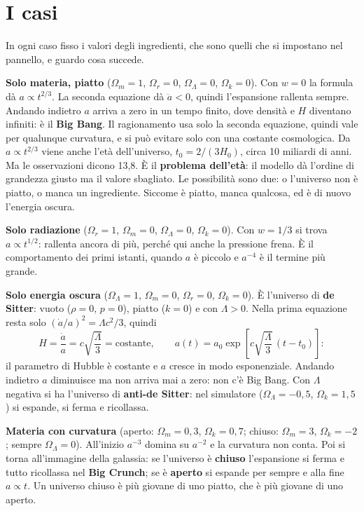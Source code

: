 \documentclass[12pt,a4paper]{article}
\begin{document}
\section{I casi}
In ogni caso fisso i valori degli ingredienti, che sono quelli che si impostano nel pannello, e guardo cosa succede.

\textbf{Solo materia, piatto} ($\Omega_m = 1$, $\Omega_r = 0$, $\Omega_\Lambda = 0$, $\Omega_k = 0$). Con $w = 0$ la formula dà $a \propto t^{2/3}$. La seconda equazione dà $\ddot a < 0$, quindi l'espansione rallenta sempre. Andando indietro $a$ arriva a zero in un tempo finito, dove densità e $H$ diventano infiniti: è il \textbf{Big Bang}. Il ragionamento usa solo la seconda equazione, quindi vale per qualunque curvatura, e si può evitare solo con una costante cosmologica. Da $a \propto t^{2/3}$ viene anche l'età dell'universo, $t_0 = 2/(3H_0)$, circa 10 miliardi di anni. Ma le osservazioni dicono 13,8. È il \textbf{problema dell'età}: il modello dà l'ordine di grandezza giusto ma il valore sbagliato. Le possibilità sono due: o l'universo non è piatto, o manca un ingrediente. Siccome è piatto, manca qualcosa, ed è di nuovo l'energia oscura.

\textbf{Solo radiazione} ($\Omega_r = 1$, $\Omega_m = 0$, $\Omega_\Lambda = 0$, $\Omega_k = 0$). Con $w = 1/3$ si trova $a \propto t^{1/2}$: rallenta ancora di più, perché qui anche la pressione frena. È il comportamento dei primi istanti, quando $a$ è piccolo e $a^{-4}$ è il termine più grande.

\textbf{Solo energia oscura} ($\Omega_\Lambda = 1$, $\Omega_m = 0$, $\Omega_r = 0$, $\Omega_k = 0$). È l'universo di \textbf{de Sitter}: vuoto ($\rho = 0$, $p = 0$), piatto ($k = 0$) e con $\Lambda > 0$. Nella prima equazione resta solo $(\dot a/a)^2 = \Lambda c^2/3$, quindi
\[ H = \frac{\dot a}{a} = c\sqrt{\frac{\Lambda}{3}} = \text{costante}, \qquad a(t) = a_0 \exp\!\left[c\sqrt{\frac{\Lambda}{3}}\,(t - t_0)\right] : \]
il parametro di Hubble è costante e $a$ cresce in modo esponenziale. Andando indietro $a$ diminuisce ma non arriva mai a zero: non c'è Big Bang. Con $\Lambda$ negativa si ha l'universo di \textbf{anti-de Sitter}: nel simulatore ($\Omega_\Lambda = -0{,}5$, $\Omega_k = 1{,}5$) si espande, si ferma e ricollassa.

\textbf{Materia con curvatura} (aperto: $\Omega_m = 0{,}3$, $\Omega_k = 0{,}7$; chiuso: $\Omega_m = 3$, $\Omega_k = -2$; sempre $\Omega_\Lambda = 0$). All'inizio $a^{-3}$ domina su $a^{-2}$ e la curvatura non conta. Poi si torna all'immagine della galassia: se l'universo è \textbf{chiuso} l'espansione si ferma e tutto ricollassa nel \textbf{Big Crunch}; se è \textbf{aperto} si espande per sempre e alla fine $a \propto t$. Un universo chiuso è più giovane di uno piatto, che è più giovane di uno aperto.
\end{document}
